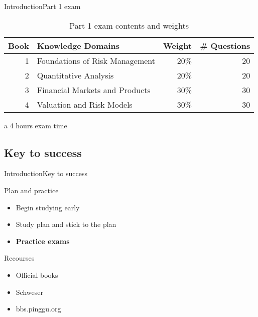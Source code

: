 \begin{frame}{Introduction}{Part 1 exam}
\begin{table}
\centering
\caption{Part 1 exam contents and weights}
\begin{threeparttable}[htbp]
	\begin{tabular}{||r|l|r|r||}
		\hline
		\hline
		\multicolumn{1}{||l|}{Book} & Knowledge Domains & \multicolumn{1}{l|}{Weight} & \multicolumn{1}{l||}{\# Questions} \bigstrut\\
		\hline
		1     & Foundations of Risk Management & 20\%  & 20 \bigstrut\\
		\hline
		2     & Quantitative Analysis & 20\%  & 20 \bigstrut\\
		\hline
		3     & Financial Markets and Products & 30\%  & 30 \bigstrut\\
		\hline
		4     & Valuation and Risk Models & 30\%  & 30 \bigstrut\\
		\hline
		\hline
	\end{tabular}
	\begin{tablenotes}
		\item [a] 4 hours exam time 
	\end{tablenotes}
\end{threeparttable}
\label{tab:weights}
\end{table}
\end{frame}

\subsection{Key to success}
\begin{frame}{Introduction}{Key to success}
\begin{block}{Plan and practice}
\begin{itemize}
\item Begin studying early
\item Study plan and stick to the plan
\item \textbf{Practice exams}
\end{itemize}
\end{block}

\begin{block}{Recourses}
\begin{itemize}
\item Official books
\item Schweser 
\item bbs.pinggu.org
\end{itemize}
\end{block}
\end{frame}

